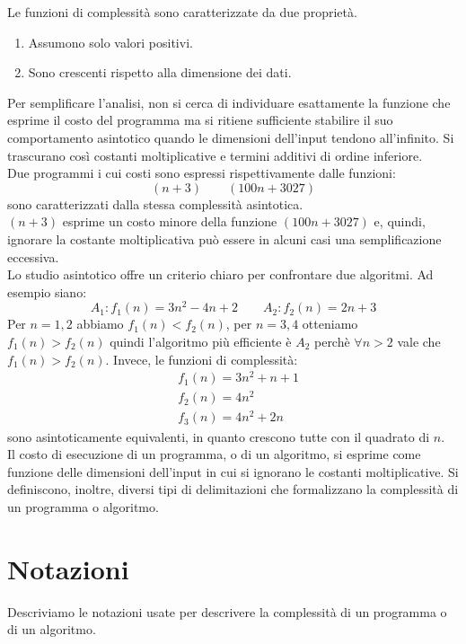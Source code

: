 \documentclass[12pt]{report}
\begin{document}
   	Le funzioni di complessità sono caratterizzate da due proprietà.
   	\begin{enumerate}
   		\item Assumono solo valori positivi.
   		\item Sono crescenti rispetto alla dimensione dei dati.
   	\end{enumerate}
   	Per semplificare l'analisi, non si cerca di individuare esattamente la funzione che esprime il costo del programma ma si ritiene sufficiente stabilire il suo comportamento asintotico quando le dimensioni dell'input tendono all'infinito. Si trascurano così costanti moltiplicative e termini additivi di ordine inferiore. \\
   	Due programmi i cui costi sono espressi rispettivamente dalle funzioni:
   	\[
   	(n + 3) \quad \quad (100n + 3027)
   	\]
   	sono caratterizzati dalla stessa complessità asintotica. \\
   	$(n + 3)$ esprime un costo minore della funzione $(100n + 3027)$ e, quindi, ignorare la costante moltiplicativa può essere in alcuni casi una semplificazione eccessiva. \\
   	Lo studio asintotico offre un criterio chiaro per confrontare due algoritmi. Ad esempio siano:
   	\[
   	A_1: f_1(n) = 3n^2 - 4n + 2 \quad \quad A_2: f_2(n) = 2n + 3
   	\]
   	Per $n = 1, 2$ abbiamo $f_1(n) < f_2(n)$, per $n = 3, 4$ otteniamo $f_1(n) > f_2(n)$ quindi l'algoritmo più efficiente è $A_2$ perchè $\forall n > 2$ vale che $f_1(n) > f_2(n)$. Invece, le funzioni di complessità:
   	\begin{align*}
   		&f_1(n) = 3n^2 + n + 1 \\
   		&f_2(n) = 4n^2 \\
   		&f_3(n) = 4n^2 + 2n
   	\end{align*}
   	sono asintoticamente equivalenti, in quanto crescono tutte con il quadrato di $n$. \\
   	Il costo di esecuzione di un programma, o di un algoritmo, si esprime come funzione delle dimensioni dell'input in cui si ignorano le costanti moltiplicative. Si definiscono, inoltre, diversi tipi di delimitazioni che formalizzano la complessità di un programma o algoritmo.
   	\section{Notazioni}
   	Descriviamo le notazioni usate per descrivere la complessità di un programma o di un algoritmo.  \\
\end{document}

